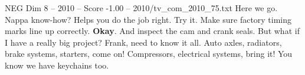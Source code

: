 \begin{textsample}{NEG Dim 8 – 2010 – Score -1.00 – 2010/tv\_com\_2010\_75.txt}  \label{ex:f8_neg_048}
Here we go.
Nappa know-how?
Helps you do the job right.
Try it.
Make sure factory timing marks line up correctly. \textbf{Okay}.
And inspect the cam and crank seals.
But what if I have a really big project?
Frank, need to know it all.
Auto axles, radiators, brake systems, starters, come on!
Compressors, electrical systems, bring it!
You know we have keychains too.

\end{textsample}
